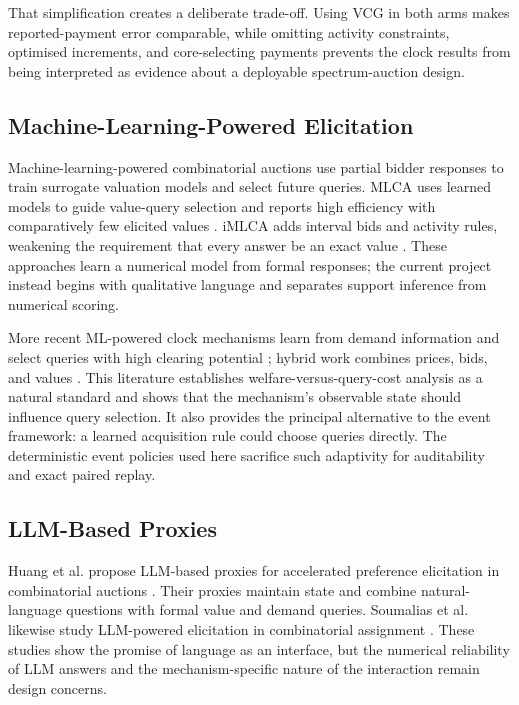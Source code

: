 That simplification creates a deliberate trade-off. Using VCG in both arms
makes reported-payment error comparable, while omitting activity constraints,
optimised increments, and core-selecting payments prevents the clock results
from being interpreted as evidence about a deployable spectrum-auction design.

\subsection{Machine-Learning-Powered Elicitation}

Machine-learning-powered combinatorial auctions use partial bidder responses to
train surrogate valuation models and select future queries. MLCA uses learned
models to guide value-query selection and reports high efficiency with
comparatively few elicited values \citep{brero2019mlca}. iMLCA adds interval
bids and activity rules, weakening the requirement that every answer be an
exact value \citep{lubin2020imlca}. These approaches learn a numerical model
from formal responses; the current project instead begins with qualitative
language and separates support inference from numerical scoring.

More recent ML-powered clock mechanisms learn from demand information and
select queries with high clearing potential \citep{soumalias2023mlcca}; hybrid
work combines prices, bids, and values \citep{soumalias2024mlhca}. This
literature establishes welfare-versus-query-cost analysis as a natural
standard and shows that the mechanism's observable state should influence
query selection. It also provides the principal alternative to the event
framework: a learned acquisition rule could choose queries directly. The
deterministic event policies used here sacrifice such adaptivity for
auditability and exact paired replay.

\subsection{LLM-Based Proxies}

Huang et al. propose LLM-based proxies for accelerated preference elicitation
in combinatorial auctions \citep{huang2025llmproxies}. Their proxies maintain
state and combine natural-language questions with formal value and demand
queries. Soumalias et al. likewise study LLM-powered elicitation in
combinatorial assignment \citep{soumalias2025llmassignment}. These studies
show the promise of language as an interface, but the numerical reliability of
LLM answers and the mechanism-specific nature of the interaction remain design
concerns.

